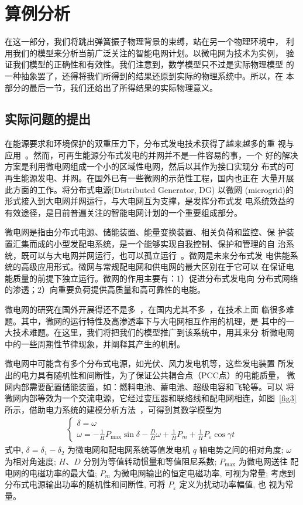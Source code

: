 \documentclass[withoutpreface,bwprint]{cumcmthesis} %
\begin{document}
\section{算例分析}
\label{sec5}

在这一部分，我们将跳出弹簧振子物理背景的束缚，站在另一个物理环境中，
利用我们的模型来分析当前广泛关注的智能电网计划。以微电网为技术为实例，
验证我们模型的正确性和有效性。我们注意到，数学模型只不过是实际物理模型
的一种抽象罢了，还得将我们所得到的结果还原到实际的物理系统中。所以，在
本部分的最后一节，我们还给出了所得结果的实际物理意义。

\subsection{实际问题的提出}
\label{sec5-1}

在能源要求和环境保护的双重压力下，分布式发电技术获得了越来越多的重
视与应用~。然而，可再生能源分布式发电的并网并不是一件容易的事，一个
好的解决方案是利用微电网组成一个小的区域性电网，然后以其作为接口实现分
布式的可再生能源发电、并网。在国外已有一些微网的示范性工程，国内也正在
大量开展此方面的工作。将分布式电源(Distributed Generator, DG) 以微网
(microgrid)的形式接入到大电网并网运行，与大电网互为支撑，是发挥分布式发
电系统效益的有效途径，是目前普遍关注的智能电网计划的一个重要组成部分。

微电网是指由分布式电源、储能装置、能量变换装置、相关负荷和监控、保
护装置汇集而成的小型发配电系统，是一个能够实现自我控制、保护和管理的自
治系统，既可以与大电网并网运行，也可以孤立运行~。微网是未来分布式发
电供能系统的高级应用形式。微网与常规配电网和供电网的最大区别在于它可以
在保证电能质量的前提下独立运行。微网的作用主要有：1）促进分布式发电向
分布式网络的渗透；2）向重要负荷提供高质量和高可靠性的电能。

微电网的研究在国外开展得还不是多~，在国内尤其不多~，在技术上面
临很多难题。其中，微网的运行特性及高渗透率下与大电网相互作用的机理，是
其中的一大技术难题。在这里，我们将把我们的模型推广到该系统中，用其来分
析微电网中的一些周期性节律现象，并阐释其产生的机制。

微电网中可能含有多个分布式电源，如光伏、风力发电机等，这些发电装置
所发出的电力具有随机性和间断性，为了保证公共耦合点（PCC点）的电能质量，
微网内部需要配置储能装置，如：燃料电池、蓄电池、超级电容和飞轮等。可以
将微网内部等效为一个交流电源，它经过变压器和联络线和配电网相连，如图~\ref{fig3}
所示，借助电力系统的建模分析方法~，可得到其数学模型为
\begin{align}
\label{eq18}
\begin{cases}
    \delta=\omega \\
    \displaystyle{\omega=-\frac{1}{H} P_{\max } \sin \delta-\frac{D}{H} \omega+\frac{1}{H} P_{m}+\frac{1}{H} P_{\varepsilon} \cos \gamma t}
\end{cases}
\end{align}
式中, $ \delta=\delta_{1}-\delta_{2}$ 为微电网和配电网系统等值发电机 $ q$ 轴电势之间的相对角度;  $\omega$ 为相对角速度;  $H $、$ D $ 分别为等值转动惯量和等值阻尼系数;  $P_{\max}$  为微电网送往 配电网的电磁功率的最大值; $ P_{m}$  为微电网输出的恒定电磁功率, 可视为常量; 考虑到分布式电源输出功率的随机性和间断性, 可将 $ P_{\varepsilon} $ 定义为扰动功率幅值, 也 视为常量。
\end{document}
